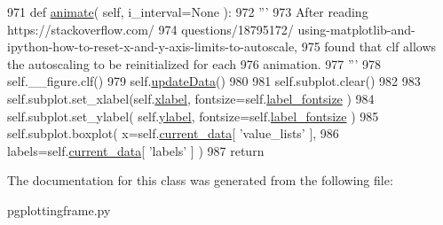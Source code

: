 \begin{DoxyCode}
971     \textcolor{keyword}{def }\hyperlink{classnegui_1_1pgplottingframe_1_1PGPlottingFrameBoxplot_a329de4586c320b5273c8d21231e55bee}{animate}( self, i\_interval=None ):
972         \textcolor{stringliteral}{'''}
973 \textcolor{stringliteral}{        After reading https://stackoverflow.com/}
974 \textcolor{stringliteral}{        questions/18795172/ using-matplotlib-and-ipython-how-to-reset-x-and-y-axis-limits-to-autoscale,}
975 \textcolor{stringliteral}{        found that clf allows the autoscaling to be reinitialized for each}
976 \textcolor{stringliteral}{        animation.}
977 \textcolor{stringliteral}{        '''}
978         self.\_\_figure.clf()
979         self.\hyperlink{classnegui_1_1pgplottingframe_1_1PGPlottingFrame_a679aad29c752aea93bd1c9ef52f1f178}{updateData}()
980 
981         self.subplot.clear()
982 
983         self.subplot.set\_xlabel(self.\hyperlink{classnegui_1_1pgplottingframe_1_1PGPlottingFrame_a58f295cc95c3b704f42d73a7ee9e0ecc}{xlabel}, fontsize=self.\hyperlink{classnegui_1_1pgplottingframe_1_1PGPlottingFrame_a1ea349c633b3db59dc2891a449438374}{label\_fontsize} )
984         self.subplot.set\_ylabel( self.\hyperlink{classnegui_1_1pgplottingframe_1_1PGPlottingFrame_a0f107b1b2523c8488daade7e06419781}{ylabel}, fontsize=self.\hyperlink{classnegui_1_1pgplottingframe_1_1PGPlottingFrame_a1ea349c633b3db59dc2891a449438374}{label\_fontsize} )
985         self.subplot.boxplot( x=self.\hyperlink{classnegui_1_1pgplottingframe_1_1PGPlottingFrame_af94a6c188cd4a4cb578130c366480d62}{current\_data}[ \textcolor{stringliteral}{'value\_lists'} ],
986                                     labels=self.\hyperlink{classnegui_1_1pgplottingframe_1_1PGPlottingFrame_af94a6c188cd4a4cb578130c366480d62}{current\_data}[ \textcolor{stringliteral}{'labels'} ] )
987         \textcolor{keywordflow}{return}
\end{DoxyCode}


The documentation for this class was generated from the following file\+:\begin{DoxyCompactItemize}
\item 
pgplottingframe.\+py\end{DoxyCompactItemize}
